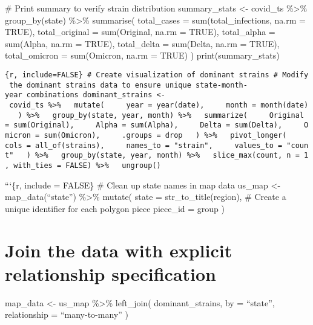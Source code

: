 \documentclass[
]{article}
\newenvironment{Shaded}{\begin{snugshade}}{\end{snugshade}}
\newcommand{\NormalTok}[1]{\textcolor[rgb]{0.00,0.23,0.31}{#1}}
\begin{document}
\begin{Shaded}
\begin{Highlighting}[]
\NormalTok{\# Print summary to verify strain distribution}
\NormalTok{summary\_stats \textless{}{-} covid\_ts \%\textgreater{}\%}
\NormalTok{  group\_by(state) \%\textgreater{}\%}
\NormalTok{  summarise(}
\NormalTok{    total\_cases = sum(total\_infections, na.rm = TRUE),}
\NormalTok{    total\_original = sum(Original, na.rm = TRUE),}
\NormalTok{    total\_alpha = sum(Alpha, na.rm = TRUE),}
\NormalTok{    total\_delta = sum(Delta, na.rm = TRUE),}
\NormalTok{    total\_omicron = sum(Omicron, na.rm = TRUE)}
\NormalTok{  )}
\NormalTok{print(summary\_stats)}
\end{Highlighting}
\end{Shaded}

\texttt{\{r,\ include=FALSE\}\ \#\ Create\ visualization\ of\ dominant\ strains\ \#\ Modify\ the\ dominant\ strains\ data\ to\ ensure\ unique\ state-month-year\ combinations\ dominant\_strains\ \textless{}-\ covid\_ts\ \%\textgreater{}\%\ \ \ mutate(\ \ \ \ \ year\ =\ year(date),\ \ \ \ \ month\ =\ month(date)\ \ \ )\ \%\textgreater{}\%\ \ \ group\_by(state,\ year,\ month)\ \%\textgreater{}\%\ \ \ summarize(\ \ \ \ \ Original\ =\ sum(Original),\ \ \ \ \ Alpha\ =\ sum(Alpha),\ \ \ \ \ Delta\ =\ sum(Delta),\ \ \ \ \ Omicron\ =\ sum(Omicron),\ \ \ \ \ .groups\ =\ \textquotesingle{}drop\textquotesingle{}\ \ \ )\ \%\textgreater{}\%\ \ \ pivot\_longer(\ \ \ \ \ cols\ =\ all\_of(strains),\ \ \ \ \ names\_to\ =\ "strain",\ \ \ \ \ values\_to\ =\ "count"\ \ \ )\ \%\textgreater{}\%\ \ \ group\_by(state,\ year,\ month)\ \%\textgreater{}\%\ \ \ slice\_max(count,\ n\ =\ 1,\ with\_ties\ =\ FALSE)\ \%\textgreater{}\%\ \ \ ungroup()}

```\{r, include = FALSE\} \# Clean up state names in map data us\_map
\textless- map\_data(``state'') \%\textgreater\% mutate( state =
str\_to\_title(region), \# Create a unique identifier for each polygon
piece piece\_id = group )

\section{Join the data with explicit relationship
specification}\label{join-the-data-with-explicit-relationship-specification}

map\_data \textless- us\_map \%\textgreater\% left\_join(
dominant\_strains, by = ``state'', relationship = ``many-to-many'' )
\end{document}
